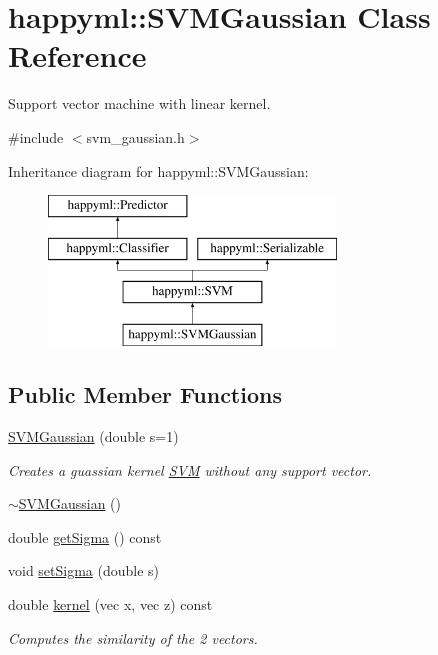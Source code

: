 \hypertarget{classhappyml_1_1SVMGaussian}{}\section{happyml\+:\+:S\+V\+M\+Gaussian Class Reference}
\label{classhappyml_1_1SVMGaussian}


Support vector machine with linear kernel.  




{\ttfamily \#include $<$svm\+\_\+gaussian.\+h$>$}

Inheritance diagram for happyml\+:\+:S\+V\+M\+Gaussian\+:\begin{figure}[H]
\begin{center}
\leavevmode
\includegraphics[height=4.000000cm]{classhappyml_1_1SVMGaussian}
\end{center}
\end{figure}
\subsection*{Public Member Functions}
\begin{DoxyCompactItemize}
\item 
\hyperlink{classhappyml_1_1SVMGaussian_ab1151f64a43cdb5e746d248f9945c894}{S\+V\+M\+Gaussian} (double s=1)
\begin{DoxyCompactList}\small\item\em Creates a guassian kernel \hyperlink{classhappyml_1_1SVM}{S\+VM} without any support vector. \end{DoxyCompactList}\item 
\hyperlink{classhappyml_1_1SVMGaussian_aa4a4e2329b1275c4b955fe9efd71deba}{$\sim$\+S\+V\+M\+Gaussian} ()
\item 
double \hyperlink{classhappyml_1_1SVMGaussian_a93a95615e16a223dbfe35897eff525ee}{get\+Sigma} () const 
\item 
void \hyperlink{classhappyml_1_1SVMGaussian_a08ceba8562b77aaf2eaca36d4cbaab05}{set\+Sigma} (double s)
\item 
double \hyperlink{classhappyml_1_1SVMGaussian_a639e1a4002720ee7041db68be4254052}{kernel} (vec x, vec z) const 
\begin{DoxyCompactList}\small\item\em Computes the similarity of the 2 vectors. \end{DoxyCompactList}\end{DoxyCompactItemize}

